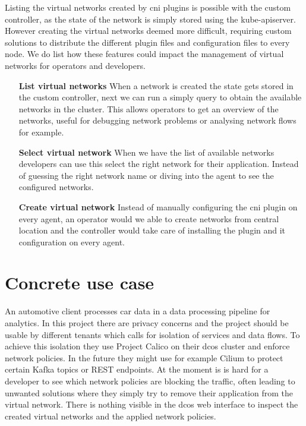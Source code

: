 Listing the virtual networks created by \gls{cni} plugins is possible with the custom controller, as the state of the network is simply stored using the kube-apiserver. However creating the virtual networks deemed more difficult, requiring custom solutions to distribute the different plugin files and configuration files to every node. We do list how these features could impact the management of virtual networks for operators and developers.
\begin{itemize}
    \item[\textbf{List virtual networks}] When a network is created the state gets stored in the custom controller, next we can run a simply query to obtain the available networks in the cluster. This allows operators to get an overview of the networks, useful for debugging network problems or analysing network flows for example.
    \item[\textbf{Select virtual network}] When we have the list of available networks developers can use this select the right network for their application. Instead of guessing the right network name or diving into the agent to see the configured networks.
    \item[\textbf{Create virtual network}] Instead of manually configuring the \gls{cni} plugin on every agent, an operator would we able to create networks from central location and the controller would take care of installing the plugin and it configuration on every agent.
\end{itemize}


\section{Concrete use case}
An automotive client processes car data in a data processing pipeline for analytics. In this project there are  privacy concerns and the project should be usable by different tenants which calls for isolation of services and data flows. To achieve this isolation they use Project Calico on their \gls{dcos} cluster and enforce network policies. In the future they might use for example Cilium to protect certain Kafka topics or REST endpoints. At the moment is is hard for a developer to see which network policies are blocking the traffic, often leading to unwanted solutions where they simply try to remove their application from the virtual network. There is nothing visible in the \gls{dcos} web interface to inspect the created virtual networks and the applied network policies.

